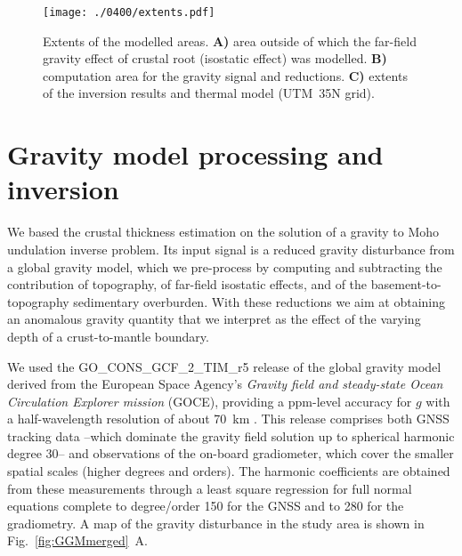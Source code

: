 \begin{figure}
    \begin{adjustbox}{center}
    \texttt{[image: ./0400/extents.pdf]}
    \end{adjustbox}
    \caption{Extents of the modelled areas. \textbf{A)} area outside of which the far-field gravity effect of crustal root (isostatic effect) was modelled. \textbf{B)} computation area for the gravity signal and reductions. \textbf{C)} extents of the inversion results and thermal model (UTM~35N grid).}
	\label{fig:extents}
\end{figure}

\section{Gravity model processing and inversion}
\label{s:Appl:Grav}

We based the crustal thickness estimation on the solution of a gravity to Moho undulation inverse problem.
Its input signal is a reduced gravity disturbance from a global gravity model, which we pre-process by computing and subtracting the contribution of topography, of far-field isostatic effects, and of the basement-to-topography sedimentary overburden.
With these reductions we aim at obtaining an anomalous gravity quantity that we interpret as the effect of the varying depth of a crust-to-mantle boundary.

We used the {GO\_CONS\_GCF\_2\_TIM\_r5} release \parencites{Brockmann2014}{Pail2011GOCE}{GOCETIMr5datasheet} of the global gravity model derived from the European Space Agency's \textit{Gravity field and steady-state Ocean Circulation Explorer mission} (GOCE), providing a ppm-level accuracy for $g$ with a half-wavelength resolution of about 70~km \parencite{Floberghagen2011_goce}.
This release comprises both GNSS tracking data --which dominate the gravity field solution up to spherical harmonic degree 30-- and observations of the on-board gradiometer, which cover the smaller spatial scales (higher degrees and orders).
The harmonic coefficients are obtained from these measurements through a least square regression for full normal equations complete to degree/order 150 for the GNSS and to 280 for the gradiometry.
A map of the gravity disturbance in the study area is shown in Fig.~\ref{fig:GGMmerged}~A.

